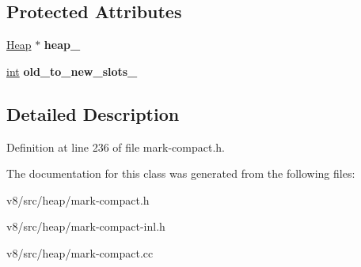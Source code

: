 \subsection*{Protected Attributes}
\begin{DoxyCompactItemize}
\item 
\mbox{\label{classv8_1_1internal_1_1MarkCompactCollectorBase_a2c01c126a581df3afba94e429b10fd91}} 
\mbox{\hyperlink{classv8_1_1internal_1_1Heap}{Heap}} $\ast$ {\bfseries heap\+\_\+}
\item 
\mbox{\label{classv8_1_1internal_1_1MarkCompactCollectorBase_a5d7ea08a0e2408dbaa12976d7bbe4ad4}} 
\mbox{\hyperlink{classint}{int}} {\bfseries old\+\_\+to\+\_\+new\+\_\+slots\+\_\+}
\end{DoxyCompactItemize}


\subsection{Detailed Description}


Definition at line 236 of file mark-\/compact.\+h.



The documentation for this class was generated from the following files\+:\begin{DoxyCompactItemize}
\item 
v8/src/heap/mark-\/compact.\+h\item 
v8/src/heap/mark-\/compact-\/inl.\+h\item 
v8/src/heap/mark-\/compact.\+cc\end{DoxyCompactItemize}
